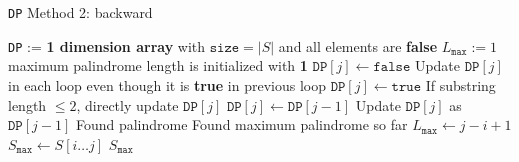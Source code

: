 \documentclass[a4paper,12pt]{article}
\begin{document}
\begin{algorithm}[H]
\caption{\texttt{DP} Method 2: backward}
\begin{algorithmic}[1]
\State \texttt{DP} := \textbf{1 dimension array} with $\mathtt{size} = |S|$ and all elements are \textbf{false}
\State $L_\mathtt{max} := 1$ \Comment maximum palindrome length is initialized with \textbf{1} 
\State $\mathtt{DP}[j] \gets \mathtt{false}$ \Comment Update $\mathtt{DP}[j]$ in each loop even though it is \textbf{true} in previous loop
\Else
{}
\State $\mathtt{DP}[j] \gets \mathtt{true}$ \Comment If substring length $\leq 2$, directly update $\mathtt{DP}[j]$
\Else 
\State $\mathtt{DP}[j] \gets \mathtt{DP}[j-1]$ \Comment  Update $\mathtt{DP}[j]$ as $\mathtt{DP}[j-1]$ 
\EndIf
\EndIf
{} \Comment Found palindrome
 \Comment Found maximum palindrome so far
\State $L_\mathtt{max} \gets j-i +1$
\State $S_\mathtt{max} \gets S[i\ldots j]$
\EndIf
\EndIf
\EndFor
\EndFor
\State \Return $S_\mathtt{max}$
\EndProcedure
\end{algorithmic}
\end{algorithm}
\end{document}
